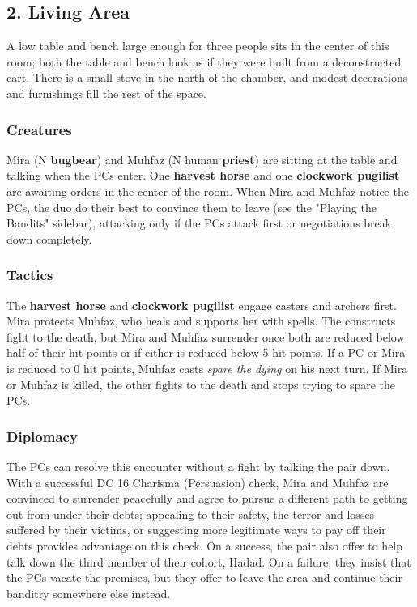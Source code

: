 \documentclass[10pt,a4paper,twoside,bg=print,twocolumn,openany,nodeprecatedcode]{dndbook}
\begin{document}
\subsection{2. Living Area}
\begin{DndReadAloud}{}
A low table and bench large enough for three people sits in the center of this room; both the table and bench look as if they were built from a deconstructed cart. There is a small stove in the north of the chamber, and modest decorations and furnishings fill the rest of the space.

\end{DndReadAloud}

\subsubsection{Creatures}
Mira (N \textbf{bugbear}) and Muhfaz (N human \textbf{priest}) are sitting at the table and talking when the PCs enter. One \textbf{harvest horse} and one \textbf{clockwork pugilist} are awaiting orders in the center of the room. When Mira and Muhfaz notice the PCs, the duo do their best to convince them to leave (see the "Playing the Bandits" sidebar), attacking only if the PCs attack first or negotiations break down completely.

\subsubsection{Tactics}
The \textbf{harvest horse} and \textbf{clockwork pugilist} engage casters and archers first. Mira protects Muhfaz, who heals and supports her with spells. The constructs fight to the death, but Mira and Muhfaz surrender once both are reduced below half of their hit points or if either is reduced below 5 hit points. If a PC or Mira is reduced to 0 hit points, Muhfaz casts \textit{spare the dying} on his next turn. If Mira or Muhfaz is killed, the other fights to the death and stops trying to spare the PCs.

\subsubsection{Diplomacy}
The PCs can resolve this encounter without a fight by talking the pair down. With a successful DC 16 Charisma (Persuasion) check, Mira and Muhfaz are convinced to surrender peacefully and agree to pursue a different path to getting out from under their debts; appealing to their safety, the terror and losses suffered by their victims, or suggesting more legitimate ways to pay off their debts provides advantage on this check. On a success, the pair also offer to help talk down the third member of their cohort, Hadad. On a failure, they insist that the PCs vacate the premises, but they offer to leave the area and continue their banditry somewhere else instead.
\end{document}
